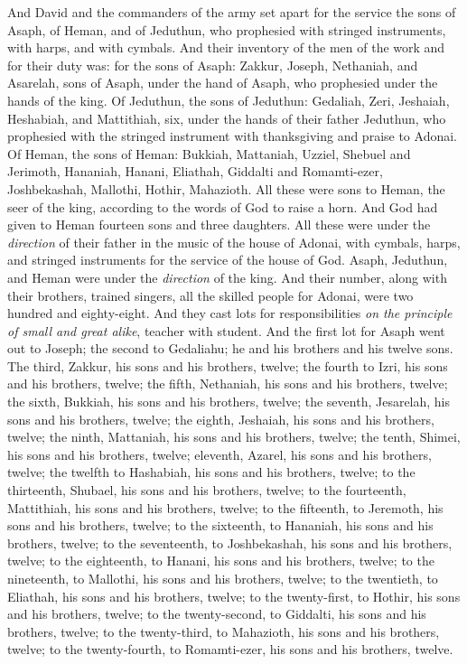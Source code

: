 \begin{biblechapter} %
 And David and the commanders of the army set apart for the service the sons of Asaph, of Heman, and of Jeduthun, who prophesied with stringed instruments, with harps, and with cymbals. And their inventory of the men of the work and for their duty was:
\verse for the sons of Asaph: Zakkur, Joseph, Nethaniah, and Asarelah, sons of Asaph, under the hand of Asaph, who prophesied under the hands of the king.
\verse Of Jeduthun, the sons of Jeduthun: Gedaliah, Zeri, Jeshaiah, Heshabiah, and Mattithiah, six, under the hands of their father Jeduthun, who prophesied with the stringed instrument with thanksgiving and praise to Adonai.
\verse Of Heman, the sons of Heman: Bukkiah, Mattaniah, Uzziel, Shebuel and Jerimoth, Hananiah, Hanani, Eliathah, Giddalti and Romamti-ezer, Joshbekashah, Mallothi, Hothir, Mahazioth.
\verse All these were sons to Heman, the seer of the king, according to the words of God to raise a horn. And God had given to Heman fourteen sons and three daughters.
\verse All these were under the \textit{direction} of their father in the music of the house of Adonai, with cymbals, harps, and stringed instruments for the service of the house of God. Asaph, Jeduthun, and Heman were under the \textit{direction} of the king.
\verse And their number, along with their brothers, trained singers, all the skilled people for Adonai, were two hundred and eighty-eight.
\verse And they cast lots for responsibilities \textit{on the principle of small and great alike}, teacher with student.
\verse And the first lot for Asaph went out to Joseph; the second to Gedaliahu; he and his brothers and his twelve sons.
\verse The third, Zakkur, his sons and his brothers, twelve;
\verse the fourth to Izri, his sons and his brothers, twelve;
\verse the fifth, Nethaniah, his sons and his brothers, twelve;
\verse the sixth, Bukkiah, his sons and his brothers, twelve;
\verse the seventh, Jesarelah, his sons and his brothers, twelve;
\verse the eighth, Jeshaiah, his sons and his brothers, twelve;
\verse the ninth, Mattaniah, his sons and his brothers, twelve;
\verse the tenth, Shimei, his sons and his brothers, twelve;
\verse eleventh, Azarel, his sons and his brothers, twelve;
\verse the twelfth to Hashabiah, his sons and his brothers, twelve;
\verse to the thirteenth, Shubael, his sons and his brothers, twelve;
\verse to the fourteenth, Mattithiah, his sons and his brothers, twelve;
\verse to the fifteenth, to Jeremoth, his sons and his brothers, twelve;
\verse to the sixteenth, to Hananiah, his sons and his brothers, twelve;
\verse to the seventeenth, to Joshbekashah, his sons and his brothers, twelve;
\verse to the eighteenth, to Hanani, his sons and his brothers, twelve;
\verse to the nineteenth, to Mallothi, his sons and his brothers, twelve;
\verse to the twentieth, to Eliathah, his sons and his brothers, twelve;
\verse to the twenty-first, to Hothir, his sons and his brothers, twelve;
\verse to the twenty-second, to Giddalti, his sons and his brothers, twelve;
\verse to the twenty-third, to Mahazioth, his sons and his brothers, twelve;
\verse to the twenty-fourth, to Romamti-ezer, his sons and his brothers, twelve.
\end{biblechapter}

